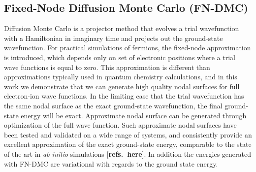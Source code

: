 \documentclass[pra,superscriptaddress,groupedaddress,twocolumn]{revtex4}
\begin{document}
\subsection{Fixed-Node Diffusion Monte Carlo (FN-DMC)}
Diffusion Monte Carlo is a projector method that evolves a trial wavefunction with a Hamiltonian in imaginary time and projects out the ground-state wavefunction.  For practical simulations of fermions, the fixed-node approximation is introduced, which depends only on set of electronic positions where a trial wave functions is equal to zero.  This approximation is different than approximations typically used in quantum chemistry calculations, and in this work we demonstrate that we can generate high quality nodal surfaces for full electron-ion wave functions. %
In the limiting case that  the trial wavefunction has the same nodal surface as the exact ground-state wavefunction, the final ground-state energy will be exact. Approximate nodal surface can be generated through optimization of the full wave function. Such approximate nodal surfaces have been tested and validated on a wide range of systems, and consistently provide an excellent approximation of the exact ground-state energy,  comparable to the state of the art in \textit{ab initio} simulations [{\bf refs.~here}].
 In addition the energies generated with FN-DMC are variational with regards to the ground state energy.  %
\end{document}
